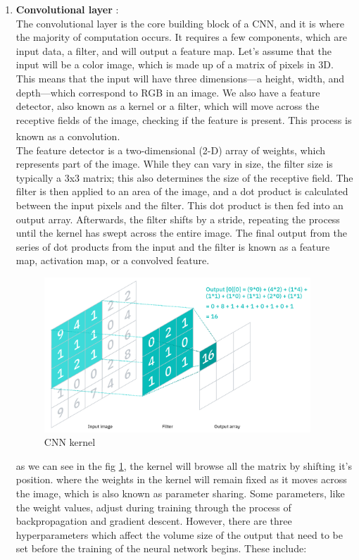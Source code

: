     
\begin{enumerate}
    \item \textbf{Convolutional layer} : \\
        The convolutional layer is the core building block of a CNN, and it is where the majority of computation occurs. It requires a few components, which are input data, a filter, and will output a feature map. Let’s assume that the input will be a color image, which is made up of a matrix of pixels in 3D. This means that the input will have three dimensions—a height, width, and depth—which correspond to RGB in an image. We also have a feature detector, also known as a kernel or a filter, which will move across the receptive fields of the image, checking if the feature is present. This process is known as a convolution. \textsuperscript{\cite{CNN-IBM}} \\
        The feature detector is a two-dimensional (2-D) array of weights, which represents part of the image. While they can vary in size, the filter size is typically a 3x3 matrix; this also determines the size of the receptive field. The filter is then applied to an area of the image, and a dot product is calculated between the input pixels and the filter. This dot product is then fed into an output array. Afterwards, the filter shifts by a stride, repeating the process until the kernel has swept across the entire image. The final output from the series of dot products from the input and the filter is known as a feature map, activation map, or a convolved feature.
        \begin{figure}[H]
            \centering
            \includegraphics[width=10cm]{../images/CNN-kernel.png}
            \caption{CNN kernel}
            \label{fig:CNN-kernel}
        \end{figure}
        as we can see in the fig \ref{fig:CNN-kernel}, the kernel will browse all the matrix by shifting it's position. where the weights in the kernel will remain fixed as it moves across the image, which is also known as parameter sharing. Some parameters, like the weight values, adjust during training through the process of backpropagation and gradient descent. However, there are three hyperparameters which affect the volume size of the output that need to be set before the training of the neural network begins. These include:

\end{enumerate}
